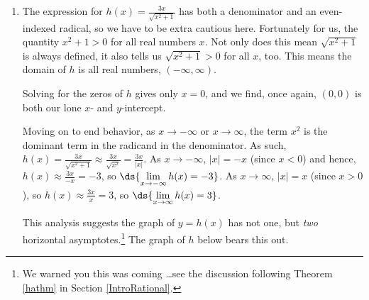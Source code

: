 \documentclass{ximera}
\begin{document}
\begin{example}
\begin{enumerate}
\smallskip

To create a sign diagram for $g(t)$, we note that the function is undefined when $t = -1$ (so we place a `\textinterrobang' above it) and has a zero $t=0$.  When  $t<-1$, $g(t) > 0$ or $(+)$, for $-1<t<0$, $g(t)<0$ or $(-)$, and for $t>0$, $g(t) > 0$ or $(+)$.   The sign diagram for $g(t)$ is below.

\begin{center}
% 
\end{center} 



 \item  The expression for $h(x) = \frac{3x}{\sqrt{x^2 + 1}}$ has both a denominator and an even-indexed radical, so we have to be extra cautious here.  Fortunately for us, the quantity $x^2+1 >0$ for all real numbers $x$. Not only does this mean $\sqrt{x^2+1}$ is always defined, it also tells us $\sqrt{x^2+1}>0$ for all $x$, too.  This means the domain of $h$ is all real numbers, $(-\infty, \infty)$.
 
Solving for the zeros of $h$ gives only $x = 0$, and we find, once again, $(0,0)$ is both our lone $x$- and $y$-intercept.  

Moving on to end behavior, as $x \rightarrow -\infty$ or  $x \rightarrow \infty$, the term $x^2$ is the dominant term in the radicand in the denominator. As such, $h(x) = \frac{3x}{\sqrt{x^2 + 1}} \approx \frac{3x}{\sqrt{x^2}} = \frac{3x}{|x|}$.  As $x \rightarrow -\infty$, $|x| = -x$ (since $x<0$) and hence, $h(x)\approx  \frac{3x}{-x} = -3$, so $\ds{\lim_{x \rightarrow -\infty} h(x) =  -3}$.   As $x \rightarrow \infty$, $|x| = x$ (since $x>0$), so $h(x) \approx \frac{3x}{x} = 3$, so $\ds{\lim_{x \rightarrow \infty} h(x) =  3}$. 
 
  This analysis suggests the graph of $y=h(x)$ has not one, but \textit{two} horizontal asymptotes.\footnote{We warned you this was coming \ldots see the discussion following Theorem \ref{hathm} in Section \ref{IntroRational}.} The graph of $h$ below bears this out.


\end{enumerate}
\end{example}
\end{document}
